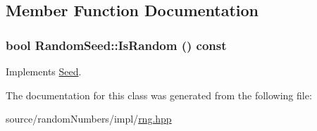 \subsection{Member Function Documentation}
\hypertarget{classRandomSeed_fbd454a2e8bc5eda68d9b10e9cb1705c}{
\subsubsection[{IsRandom}]{\setlength{\rightskip}{0pt plus 5cm}bool RandomSeed::IsRandom () const}}
\label{classRandomSeed_fbd454a2e8bc5eda68d9b10e9cb1705c}




Implements \hyperlink{classSeed_d07ddf0065c61a3dea72238a93e2bb35}{Seed}.

The documentation for this class was generated from the following file:\begin{CompactItemize}
\item 
source/randomNumbers/impl/\hyperlink{rng_8hpp}{rng.hpp}\end{CompactItemize}

